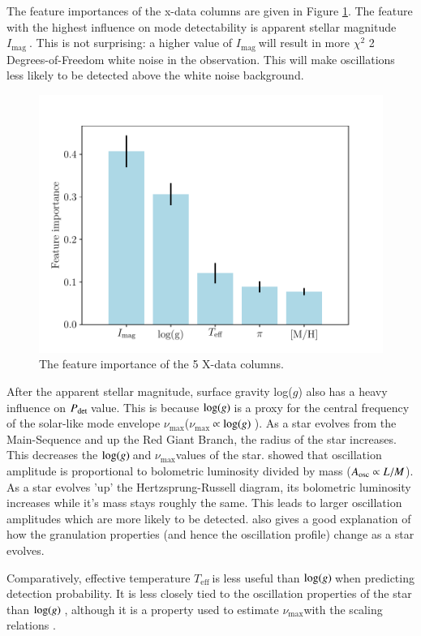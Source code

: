 \documentclass[a4paper,fleqn,usenatbib,useAMS]{mnras}
\newcommand{\numax}{\ensuremath{\nu_{\textrm{max}}}}
\newcommand{\teff}{\ensuremath{T_{\textrm{eff}}\:}}
\newcommand{\pdet}{\ensuremath{P_{\rm det}\:}}
\newcommand{\imag}{\ensuremath{I_{\textrm{mag}}\:}}
\newcommand{\logg}{\ensuremath{{\rm log}(g)\:}}
\begin{document}
The feature importances of the x-data columns are given in Figure \ref{fig:feature}. The feature with the highest influence on mode detectability is apparent stellar magnitude \imag. This is not surprising: a higher value of \imag will result in more $\chi^{2}$ 2 Degrees-of-Freedom white noise in the observation. This will make oscillations less likely to be detected above the white noise background.
\begin{figure}
	\centering
	\includegraphics[scale=0.5]{Plot1_featureimportance.pdf}
	\caption{The feature importance of the 5 X-data columns.}	
	\label{fig:feature}
\end{figure}

After the apparent stellar magnitude, surface gravity log($g$) also has a heavy influence on \pdet value. This is because \logg is a proxy for the central frequency of the solar-like mode envelope \numax \:(\numax $\: \propto\logg$). As a star evolves from the Main-Sequence and up the Red Giant Branch, the radius of the star increases. This decreases the \logg and \numax values of the star. \citet{kjeldsen_amplitudes_1995} showed that oscillation amplitude is proportional to bolometric luminosity divided by mass ($A_{\rm osc} \propto L/M$). As a star evolves 'up' the Hertzsprung-Russell diagram, its bolometric luminosity increases while it's mass stays roughly the same. This leads to larger oscillation amplitudes which are more likely to be detected. \citet{mathur_granulation_2011} also gives a good explanation of how the granulation properties (and hence the oscillation profile) change as a star evolves. 

Comparatively, effective temperature \teff is less useful than \logg when predicting detection probability. It is less closely tied to the oscillation properties of the star than \logg, although it is a property used to estimate \numax with the scaling relations \citep{chaplin_predicting_2011}. 
\end{document}
